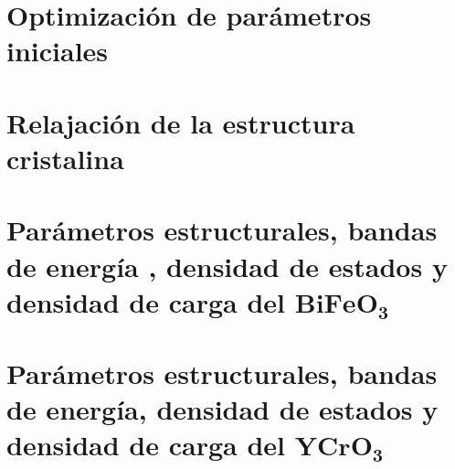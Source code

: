 
\section{Optimizaci\'on de par\'ametros iniciales}



\section{Relajaci\'on de la estructura cristalina}



\section{Par\'ametros estructurales, bandas de energ\'ia , densidad de estados 
y densidad de carga del $\mathbf{BiFeO_{3}}$}



\section{Par\'ametros estructurales, bandas de energ\'ia, densidad de estados y 
densidad de carga del $\mathbf{YCrO_{3}}$}

